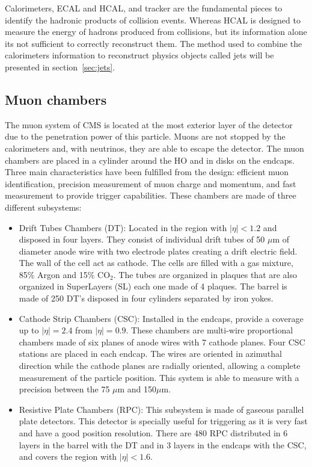 Calorimeters, ECAL and HCAL, and tracker are the fundamental pieces to identify the hadronic products of collision events. Whereas HCAL is designed to measure the energy of hadrons produced from collisions, but its information alone its not sufficient to correctly reconstruct them. The method used to combine the calorimeters information to reconstruct physics objects called jets will be presented in section~\ref{sec:jets}.

\subsection{Muon chambers}
\label{sec:muons}

The muon system of CMS is located at the most exterior layer of the detector  due to the penetration power of this particle. Muons are not stopped by the calorimeters and, with neutrinos, they are able to escape the detector. The muon chambers are placed in a cylinder around the HO and in disks on the endcaps. Three main characteristics have been fulfilled from the design: efficient muon identification, precision measurement of muon charge and momentum, and fast measurement to provide trigger capabilities. These chambers are made of three different subsystems:
\begin{itemize}
\item Drift Tubes Chambers (DT): Located in the region with $|\eta|<1.2$ and disposed in four layers. They consist of individual drift tubes of 50 $\mu$m of diameter anode wire with two electrode plates creating a drift electric field. The wall of the cell act as cathode. The cells are filled with a gas mixture, 85\% Argon and 15\% $\text{CO}_{2}$. The tubes are organized in plaques that are also organized in SuperLayers (SL) each one made of 4 plaques. The barrel is made of 250 DT's disposed in four cylinders separated by iron yokes. 
\item Cathode Strip Chambers (CSC): Installed in the endcaps, provide a coverage up to $|\eta|=2.4$ from $|\eta|=0.9$. These chambers are multi-wire proportional chambers made of six planes of anode wires with 7 cathode planes. Four CSC stations are placed in each endcap. The wires are oriented in azimuthal direction while the cathode planes are radially oriented, allowing a complete measurement of the particle position. This system is able to measure with a precision between the 75 $\mu$m and 150$\mu$m.
\item Resistive Plate Chambers (RPC): This subsystem is made of gaseous parallel plate detectors. This detector is specially useful for triggering as it is very fast and have a good position resolution. There are 480 RPC distributed in 6 layers in the barrel with the DT and in 3 layers in the endcaps with the CSC, and covers the region with $|\eta|<1.6$. 
\end{itemize}

